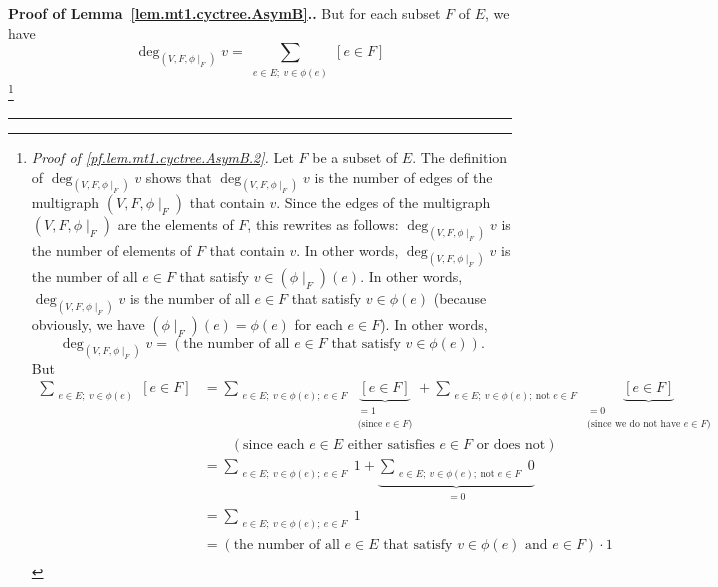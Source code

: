 \documentclass[numbers=enddot,12pt,final,onecolumn,notitlepage]{scrartcl}%
\theoremstyle{definition}
\newenvironment{proof}[1][Proof]{\noindent\textbf{#1.} }{\ \rule{0.5em}{0.5em}}
\let\sumnonlimits\sum
\renewcommand{\sum}{\sumnonlimits\limits}
\newcommand{\tup}[1]{\left( #1 \right)}
\newcommand{\ive}[1]{\left[ #1 \right]}
\newcommand{\underbrack}[2]{\underbrace{#1}_{\substack{#2}}}
\begin{document}
\begin{proof}[Proof of Lemma~\ref{lem.mt1.cyctree.AsymB}.]
But for each subset $F$ of $E$, we have
\begin{equation}
\deg_{\tup{V, F, \phi\mid_F}} v
= \sum_{\substack{e \in E;\ v \in \phi\tup{e}}} \ive{e \in F}
\label{pf.lem.mt1.cyctree.AsymB.2}
\end{equation}
\footnote{\textit{Proof of \eqref{pf.lem.mt1.cyctree.AsymB.2}.}
Let $F$ be a subset of $E$.
The definition of $\deg_{\tup{V, F, \phi\mid_F}} v$ shows that
$\deg_{\tup{V, F, \phi\mid_F}} v$ is the number of edges of the
multigraph $\tup{V, F, \phi\mid_F}$ that contain $v$. Since the edges
of the multigraph $\tup{V, F, \phi\mid_F}$ are the elements of $F$,
this rewrites as follows:
$\deg_{\tup{V, F, \phi\mid_F}} v$ is the number of elements of $F$
that contain $v$. In other words,
$\deg_{\tup{V, F, \phi\mid_F}} v$ is the number of all $e \in F$ that
satisfy $v \in \tup{\phi\mid_F}\tup{e}$.
In other words,
$\deg_{\tup{V, F, \phi\mid_F}} v$ is the number of all $e \in F$ that
satisfy $v \in \phi\tup{e}$ (because obviously, we have
$\tup{\phi\mid_F}\tup{e} = \phi\tup{e}$ for each $e \in F$).
In other words,
\begin{equation}
\deg_{\tup{V, F, \phi\mid_F}} v
= \tup{\text{the number of all } e \in F \text{ that satisfy }
          v \in \phi\tup{e}} .
\label{pf.lem.mt1.cyctree.AsymB.2.pf.1}
\end{equation}
But
\begin{align*}
\sum_{\substack{e \in E;\ v \in \phi\tup{e}}} \ive{e \in F}
&= \sum_{\substack{e \in E;\ v \in \phi\tup{e}; \  e \in F}}
            \underbrack{\ive{e \in F}}
                       {= 1 \\ \text{(since } e \in F \text{)}}
 + \sum_{\substack{e \in E;\ v \in \phi\tup{e};
                \ \text{not } e \in F}}
            \underbrack{\ive{e \in F}}
                       {= 0 \\ \text{(since we do not have }
                                e \in F \text{)}} \\\
&\qquad \left(\text{since each } e \in E \text{ either satisfies }
                    e \in F \text{ or does not}\right) \\
&= \sum_{\substack{e \in E;\ v \in \phi\tup{e}; \  e \in F}} 1
 + \underbrack{\sum_{\substack{e \in E;\ v \in \phi\tup{e};
                        \ \text{not } e \in F}} 0}
              {= 0}
\\
&= \sum_{\substack{e \in E;\ v \in \phi\tup{e}; \  e \in F}} 1 \\
&= \tup{\text{the number of all } e \in E \text{ that satisfy }
          v \in \phi\tup{e} \text{ and } e \in F} \cdot 1 \\

\end{align*}}
\end{proof}
\end{document}
